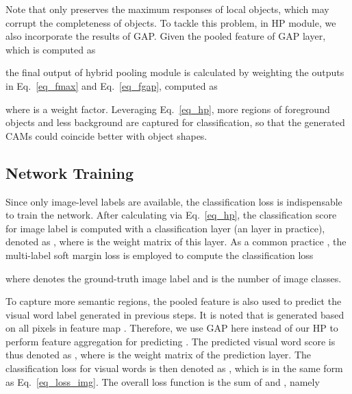 \par Note that  only preserves the maximum responses of local objects, which may corrupt the completeness of objects. To tackle this problem, in HP module, we also incorporate the results of GAP. Given the pooled feature of GAP layer, which is computed as

the final output of hybrid pooling module is calculated by weighting the outputs in Eq.~\eqref{eq_fmax} and Eq.~\eqref{eq_fgap}, computed as

where  is a weight factor. Leveraging Eq.~\eqref{eq_hp}, more regions of foreground objects and less background are captured for classification, so that the generated CAMs could coincide better with object shapes.

\subsection{Network Training}
\label{sec_net_training}
\par Since only image-level labels are available, the classification loss is indispensable to train the network. After calculating  via Eq.~\eqref{eq_hp}, the classification score for image label is computed with a classification layer (an  layer in practice), denoted as , where  is the weight matrix of this layer. As a common practice \citep{wang2020self,chang2020weakly,araslanov2020single}, the multi-label soft margin loss \citep{paszke2019pytorch} is employed to compute the classification loss

where  denotes the ground-truth image label and  is the number of image classes.

\par To capture more semantic regions, the pooled feature is also used to predict the visual word label  generated in previous steps. It is noted that  is generated based on all pixels in feature map . Therefore, we use GAP here instead of our HP to perform feature aggregation for predicting . The predicted visual word score is thus denoted as , where  is the weight matrix of the prediction layer. The classification loss for visual words is then denoted as , which is in the same form as Eq.~\eqref{eq_loss_img}. The overall loss function is the sum of  and , namely

